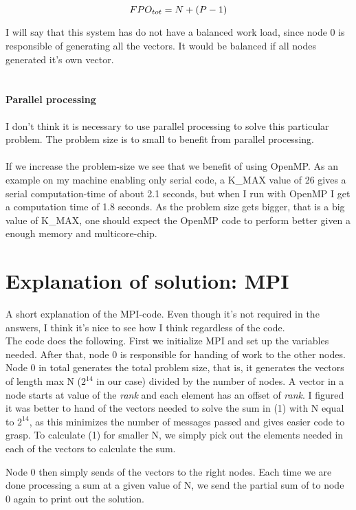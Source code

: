 \documentclass{article}
\begin{document}
\begin{equation}
	FPO_{tot} = N + (P-1) \\
\end{equation}   


I will say that this system has do not have a balanced work load, since node 0 is responsible of generating all the vectors. It would be balanced if all nodes generated it's own vector.\\ \\


\paragraph*{Parallel processing}

I don't think it is necessary to use parallel processing to solve this particular problem. The problem size is to small to benefit from parallel processing. \\ \\
If we increase the problem-size we see that we benefit of using OpenMP. As an example on my machine enabling only serial code, a K\_MAX value of 26 gives a serial computation-time of about 2.1 seconds, but when I run with OpenMP I get a computation time of 1.8 seconds. As the problem size gets bigger, that is a big value of K\_MAX, one should expect the OpenMP code to perform better given a enough memory and multicore-chip. 


\newpage

\section*{Explanation of solution: MPI}
A short explanation of the MPI-code. Even though it's not required in the answers, I think it's nice to see how I think regardless of the code. \\
The code does the following. First we initialize MPI and set up the variables needed. After that, node 0 is responsible for handing of work to the other nodes. Node 0 in total generates the total problem size, that is, it generates the vectors of length max N ($2^{14}$ in our case) divided by the number of nodes. A vector in a node starts at value of the \emph{rank} and each element has an offset of \emph{rank}. I figured it was better to hand of the vectors needed to solve the sum in (1) with N equal to $2^{14}$, as this minimizes the number of messages passed and gives easier code to grasp. To calculate (1) for smaller N, we simply pick out the elements needed in each of the vectors to calculate the sum.

Node 0 then simply sends of the vectors to the right nodes. Each time we are done processing a sum at a given value of N, we send the partial sum of to node 0 again to print out the solution. 
\end{document}
